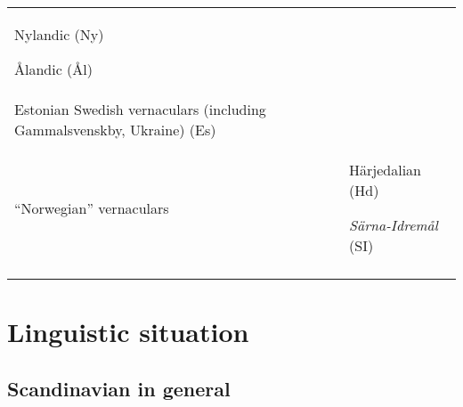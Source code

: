 \begin{tabular}{ll}
\item {}
Nylandic (Ny)

\item {}
Ålandic (Ål)

\\
Estonian Swedish vernaculars (including Gammalsvenskby, Ukraine) (Es) & \\
“Norwegian” vernaculars &
Härjedalian (Hd)

\textit{Särna-Idremål} (SI)

\\
\lspbottomrule
\end{tabular}

\section{}

\section{Linguistic situation}
\subsection{\rmfamily Scandinavian in general}

